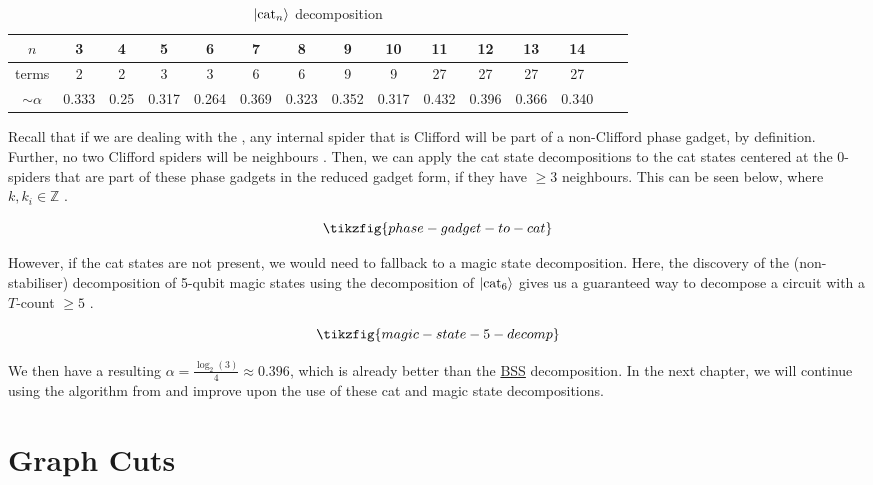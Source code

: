 \begin{table}[h!]
\centering
\scriptsize
\begin{tabular}{|c|c|c|c|c|c|c|c|c|c|c|c|c|c|c|}
\hline
$n$ & 3 & 4 & 5 & 6 & 7 & 8 & 9 & 10 & 11 & 12 & 13 & 14 \\ \hline
terms & 2 & 2 & 3 & 3 & 6 & 6 & 9 & 9 & 27 & 27 & 27 & 27 \\ \hline
$\sim \alpha$ & 0.333 & 0.25 & 0.317 & 0.264 & 0.369 & 0.323 & 0.352 & 0.317 & 0.432 & 0.396 & 0.366 & 0.340 \\ \hline
\end{tabular}
\caption{$\left| \text{cat}_{n} \right\rangle$ decomposition}
\label{tab:cat_decomp}
\end{table}

Recall that if we are dealing with the ,
any internal spider that is Clifford will be part of a non-Clifford phase gadget, by definition.
Further, no two Clifford spiders will be neighbours \cite{Kissinger2022cat}.
Then, we can apply the cat state decompositions to the cat states centered at the 0-spiders 
that are part of these phase gadgets in the reduced gadget form, if they have $\geq 3$ neighbours.
This can be seen below, where $k,k_i\in\mathbb{Z}$ \cite{Kissinger2022cat}.

\begin{equation}
    \tikzfig{phase-gadget-to-cat}
\end{equation}

However, if the cat states are not present, we would need to fallback to a magic state decomposition.
Here, the discovery of the (non-stabiliser) decomposition of 5-qubit magic states
using the decomposition of $\left| \text{cat}_{6} \right\rangle$ gives us a guaranteed way to decompose a circuit with 
a $T$-count $\geq 5$ \cite{Kissinger2022cat}.

\begin{equation}
    \label{eq:magic-5-decomp}
    \tikzfig{magic-state-5-decomp}
\end{equation}

We then have a resulting $\alpha = \frac{\log_2(3)}{4} \approx 0.396$, 
which is already better than the \hyperref[eq:bss_decomp]{BSS} decomposition.
In the next chapter, we will continue using the algorithm from \cite{Kissinger2022cat}
and improve upon the use of these cat and magic state decompositions.

\section{Graph Cuts}
\label{sec:graph-cut}

